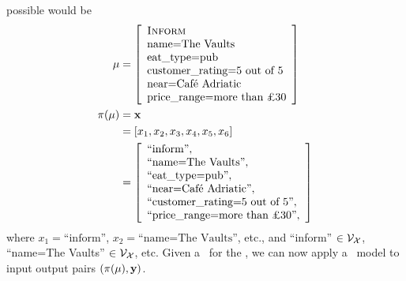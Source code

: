  ~\\~\\
 possible \linearizationstrategy would be
 \begingroup
 \renewcommand*\arraystretch{.6}
 \begin{align}
     \mr &=
\left[\begin{array}{l} 
        \textsc{Inform} \\
        \textrm{name=The Vaults} \\
        \textrm{eat\_type=pub} \\
    \textrm{customer\_rating=5 out of 5} \\
    \textrm{near=Caf{\'e} Adriatic} \\
    \textrm{price\_range=more than \pounds 30}
\end{array}\right] \\
\ls(\mr) & = \mrtoks \\
        & = \left[x_1,x_2,x_3,x_4,x_5,x_6\right] \\
        & = \left[\begin{array}{l}
        \textrm{``inform''}, \\
        \textrm{``name=The Vaults''}, \\
        \textrm{``eat\_type=pub''}, \\
        \textrm{``near=Caf{\'e} Adriatic''}, \\
        \textrm{``customer\_rating=5 out of 5''}, \\
        \textrm{``price\_range=more than \pounds 30''},
\end{array}\right]
 \end{align}\endgroup
 where $x_1=\textrm{``inform''}$, $x_2=\textrm{``name=The Vaults''}$, etc., and 
``inform'' $\in \mathcal{V}_{\mathcal{X}}$, ``name=The Vaults'' $\in \mathcal{V}_{\mathcal{X}}$, etc.
Given a \linearizationstrategy~for the \meaningrepresentations,
we can now apply a \sequencetosequence~model to input output pairs $(\pi(\mu),\mathbf{y})$.




%
% 
%
%


